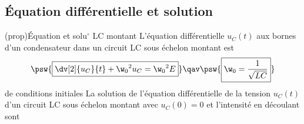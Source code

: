 \documentclass[../../main/main.tex]{subfiles}
\begin{document}
\subsection{Équation différentielle et solution}
	\begin{tcb}[label=prop:eqdiffrc, sidebyside, righthand ratio=.4]
    (prop){Équation et solu$^\circ$ LC montant}
		L'équation différentielle $u_C(t)$ aux bornes d'un
		condensateur dans un circuit LC sous échelon montant est
			\[
		\psw{%
				\boxed{\dv[2]{u_C}{t} + \w_0{}^2u_C = \w_0{}^{2}E}
		}%
    \qav
		\psw{%
			\boxed{\w_0 = \frac{1}{\sqrt{LC}}}
		}%
			\]
		de conditions initiales
    \vspace{-15pt}
		\tcblower
    La solution de l'équation différentielle de la tension $u_C(t)$
    d'un circuit LC sous échelon montant avec $u_C(0) = 0$ et l'intensité en
    découlant sont
	\end{tcb}
\end{document}
